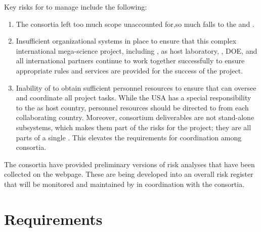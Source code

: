 Key risks for  to manage include the following:
\begin{enumerate}
\item The consortia left too much scope  unaccounted for,so much falls
  to the  and .
\item Insufficient organizational systems in place to
  ensure that this complex international mega-science project,
  including , \fnal as host laboratory, \surf, DOE, and all international
  partners continue to work together successfully to ensure
  appropriate rules and services are provided for the success of
  the project.
\item Inability of  to obtain sufficient personnel resources to
  ensure that  can oversee and coordinate all project tasks.  While the USA  has a special responsibility to the
   as host country, personnel resources should
  be directed to  from each collaborating country. Moreover, consortium deliverables are not 
  stand-alone subsystems, which makes them part of the risks for the project; they are all parts of a single . This
  elevates the requirements for coordination among consortia.
\end{enumerate}

The consortia have provided preliminary versions of risk analyses that
have been collected on the  webpage. These are being developed into
an overall risk register that will be monitored and maintained by 
in coordination with the consortia.

\section{Requirements}
\label{sec:fdsp-coord-requirements}

